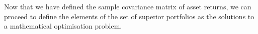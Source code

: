     
    Now that we have defined the sample covariance matrix of asset returns, we can proceed to define the elements of the set of superior portfolios as the solutions to a mathematical optimisation problem. 
    
